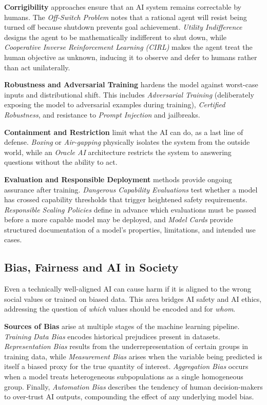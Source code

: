 \textbf{Corrigibility} approaches ensure that an AI system remains correctable by humans. The \textit{Off-Switch Problem} notes that a rational agent will resist being turned off because shutdown prevents goal achievement.
\textit{Utility Indifference} designs the agent to be mathematically
indifferent to shut down, while \textit{Cooperative Inverse Reinforcement
	Learning (CIRL)} makes the agent treat the human objective as unknown,
inducing it to observe and defer to humans rather than act unilaterally.

\textbf{Robustness and Adversarial Training} hardens the model against
worst-case inputs and distributional shift. This includes \textit{Adversarial Training} (deliberately exposing the model to adversarial examples during training), \textit{Certified Robustness}, and resistance to \textit{Prompt Injection} and jailbreaks.

\textbf{Containment and Restriction} limit what the AI can do, as a last line of defense. \textit{Boxing} or \textit{Air-gapping} physically isolates the system from the outside world, while an \textit{Oracle AI} architecture restricts the system to answering questions without the ability to act.

\textbf{Evaluation and Responsible Deployment} methods provide ongoing
assurance after training. \textit{Dangerous Capability Evaluations} test
whether a model has crossed capability thresholds that trigger heightened
safety requirements. \textit{Responsible Scaling Policies} define in advance which evaluations must be passed before a more capable model may be deployed, and \textit{Model Cards} provide structured documentation of a model's properties, limitations, and intended use cases.


\subsection{Bias, Fairness and AI in Society}
\label{subsec:bias-fairness}

Even a technically well-aligned AI can cause harm if it is aligned to the
wrong social values or trained on biased data. This area bridges AI safety and AI ethics, addressing the question of \textit{which} values should be encoded and for \textit{whom}.

\textbf{Sources of Bias} arise at multiple stages of the machine learning
pipeline. \textit{Training Data Bias} encodes historical prejudices present in datasets. \textit{Representation Bias} results from the underrepresentation of certain groups in training data, while \textit{Measurement Bias} arises when the variable being predicted is itself a biased proxy for the true quantity of interest. \textit{Aggregation Bias} occurs when a model treats heterogeneous subpopulations as a single homogeneous group. Finally, \textit{Automation Bias} describes the tendency of human decision-makers to over-trust AI outputs,
compounding the effect of any underlying model bias.

